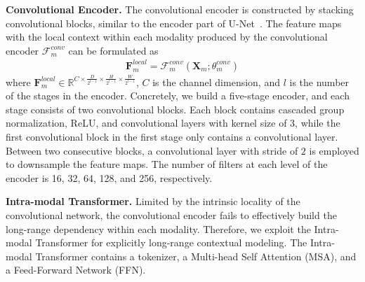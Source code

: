 \documentclass[runningheads]{llncs}
\begin{document}
\noindent\textbf{Convolutional Encoder.}
The convolutional encoder is constructed by stacking convolutional blocks, similar to the encoder part of U-Net~\cite{ronneberger2015u}. The feature maps with the local context within each modality produced by the convolutional encoder $\mathcal{F}^{conv}_m$ can be formulated as
\begin{equation}
	\begin{aligned}
	    \mathbf{F}^{local}_m = \mathcal{F}^{conv}_m(\mathbf{X}_m; \theta^{conv}_m)
	\end{aligned}
\end{equation}
where $\mathbf{F}^{local}_m \in \mathbb{R}^{C\times \frac{D}{2^{l-1}}\times \frac{H}{2^{l-1}}\times \frac{W}{2^{l-1}}}$, $C$ is the channel dimension, and $l$ is the number of the stages in the encoder. Concretely, we build a five-stage encoder, and each stage consists of two convolutional blocks. Each block contains cascaded group normalization, ReLU, and convolutional layers with kernel size of $3$, while the first convolutional block in the first stage only contains a convolutional layer. Between two consecutive blocks, a convolutional layer with stride of $2$ is employed to downsample the feature maps. The number of filters at each level of the encoder is 16, 32, 64, 128, and 256, respectively.

\noindent\textbf{Intra-modal Transformer.}
Limited by the intrinsic locality of the convolutional network, the convolutional encoder fails to effectively build the long-range dependency within each modality. Therefore, we exploit the Intra-modal Transformer for explicitly long-range contextual modeling. The Intra-modal Transformer contains a tokenizer, a Multi-head Self Attention (MSA), and a Feed-Forward Network (FFN). 
\end{document}
